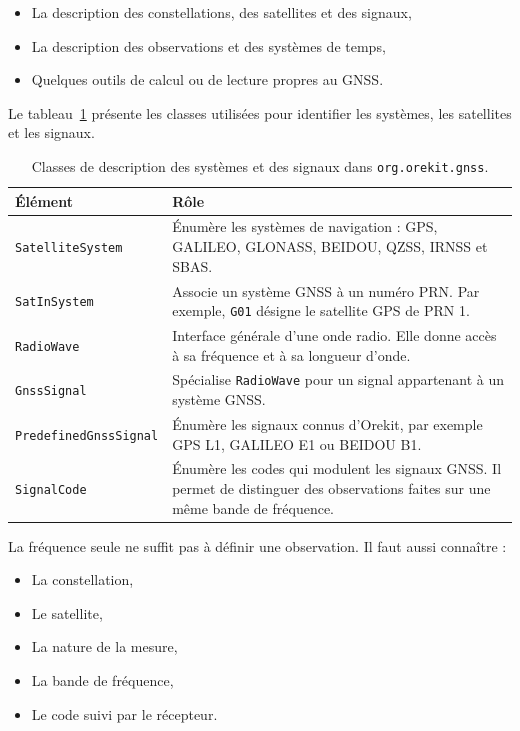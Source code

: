 \begin{itemize}
    \item La description des constellations, des satellites et des signaux,
    \item La description des observations et des systèmes de temps,
    \item Quelques outils de calcul ou de lecture propres au GNSS.
\end{itemize}

Le tableau~\ref{tab:orekit_gnss_identification} présente les classes utilisées
pour identifier les systèmes, les satellites et les signaux.

\begin{table}[htbp]
\centering
\small
\begin{tabularx}{\textwidth}{|>{\raggedright\arraybackslash}p{}|
                                  >{\raggedright\arraybackslash}X|}
\hline
\textbf{Élément} & \textbf{Rôle} \\
\hline
\texttt{SatelliteSystem} & Énumère les systèmes de navigation : GPS,
GALILEO, GLONASS, BEIDOU, QZSS, IRNSS et SBAS. \\
\hline
\texttt{SatInSystem} & Associe un système GNSS à un numéro PRN. Par exemple,
\texttt{G01} désigne le satellite GPS de PRN 1. \\
\hline
\texttt{RadioWave} & Interface générale d'une onde radio. Elle donne
accès à sa fréquence et à sa longueur d'onde. \\
\hline
\texttt{GnssSignal} & Spécialise \texttt{RadioWave} pour un signal appartenant
à un système GNSS. \\
\hline
\texttt{PredefinedGnssSignal} & Énumère les signaux connus d'Orekit, par
exemple GPS L1, GALILEO E1 ou BEIDOU B1. \\
\hline
\texttt{SignalCode} & Énumère les codes qui modulent les signaux GNSS. Il
permet de distinguer des observations faites sur une même bande de fréquence. \\
\hline
\end{tabularx}
\caption{Classes de description des systèmes et des signaux dans
\texttt{org.orekit.gnss}.}
\label{tab:orekit_gnss_identification}
\end{table}

La fréquence seule ne suffit pas à définir une observation. Il faut aussi
connaître :

\begin{itemize}
    \item La constellation,
    \item Le satellite,
    \item La nature de la mesure,
    \item La bande de fréquence,
    \item Le code suivi par le récepteur.
\end{itemize}

